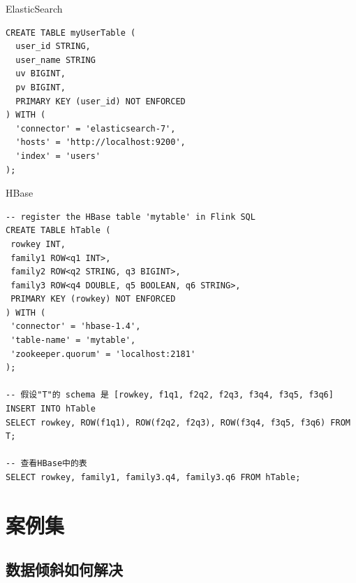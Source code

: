 \documentclass[cn,11pt,chinese]{elegantbook}
\begin{document}
ElasticSearch

\begin{verbatim}
CREATE TABLE myUserTable (
  user_id STRING,
  user_name STRING
  uv BIGINT,
  pv BIGINT,
  PRIMARY KEY (user_id) NOT ENFORCED
) WITH (
  'connector' = 'elasticsearch-7',
  'hosts' = 'http://localhost:9200',
  'index' = 'users'
);
\end{verbatim}

HBase

\begin{verbatim}
-- register the HBase table 'mytable' in Flink SQL
CREATE TABLE hTable (
 rowkey INT,
 family1 ROW<q1 INT>,
 family2 ROW<q2 STRING, q3 BIGINT>,
 family3 ROW<q4 DOUBLE, q5 BOOLEAN, q6 STRING>,
 PRIMARY KEY (rowkey) NOT ENFORCED
) WITH (
 'connector' = 'hbase-1.4',
 'table-name' = 'mytable',
 'zookeeper.quorum' = 'localhost:2181'
);

-- 假设"T"的 schema 是 [rowkey, f1q1, f2q2, f2q3, f3q4, f3q5, f3q6]
INSERT INTO hTable
SELECT rowkey, ROW(f1q1), ROW(f2q2, f2q3), ROW(f3q4, f3q5, f3q6) FROM T;

-- 查看HBase中的表
SELECT rowkey, family1, family3.q4, family3.q6 FROM hTable;
\end{verbatim}

\chapter{案例集}

\section{数据倾斜如何解决}
\end{document}
